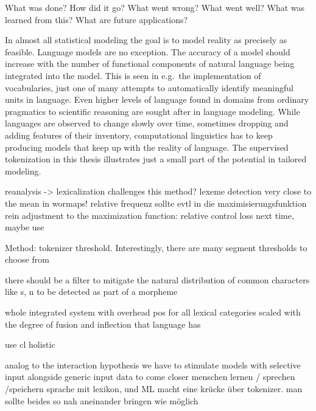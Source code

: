 What was done?
How did it go?
What went wrong?
What went well?
What was learned from this?
What are future applications?

In almost all statistical modeling the goal is to model reality as precisely as feasible.
Language models are no exception.
The accuracy of a model should increase with the number of functional components of natural language being integrated into the model.
This is seen in e.g.\ the implementation of vocabularies, just one of many attempts to automatically identify meaningful units in language.
Even higher levels of language found in domains from ordinary pragmatics to scientific reasoning are sought after in language modeling.
While languages are observed to change slowly over time, sometimes dropping and adding features of their inventory, computational linguistics has to keep producing models that keep up with the reality of language.
The supervised tokenization in this thesis illustrates just a small part of the potential in tailored modeling.



reanalysis -> lexicalization challenges this method?
lexeme detection very close to the mean in wormaps!
relative frequenz sollte evtl in die maximisierungsfunktion rein
adjustment to the maximization function: relative
control loss next time, maybe use ~\textcite{bertbasegermancasedsequel}

Method: tokenizer threshold.
Interestingly, there are many segment thresholds to choose from

there should be a filter to mitigate the natural distribution of common characters like s, n to be detected as  part of a morpheme

whole integrated system with overhead pos for all lexical categories
scaled with the degree of fusion and inflection that language has

use \ac{cl}
holistic

analog to the interaction hypothesis we have to stimulate models with selective input alongside generic input data to come closer
menschen lernen / sprechen /speichern sprache mit lexikon, und ML macht eine krücke über tokenizer. man sollte beides so nah aneinander bringen wie möglich